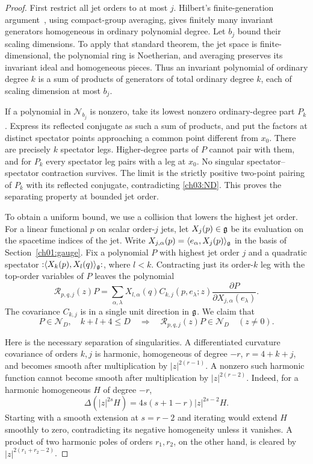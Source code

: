 \begin{proof}
First restrict all jet orders to at most $j$. Hilbert's finite-generation
argument~\cite{Hilbert1890}, using compact-group averaging, gives
finitely many invariant generators homogeneous in ordinary polynomial
degree. Let $b_j$ bound their scaling dimensions. To apply that standard theorem,
the jet space is finite-dimensional, the polynomial ring is Noetherian,
and averaging preserves its invariant ideal and homogeneous pieces.
Thus an invariant polynomial of ordinary degree $k$ is a sum of products
of generators of total ordinary degree $k$, each of scaling dimension at most $b_j$.

If a polynomial in $\mathcal N_{b_j}$ is nonzero, take its lowest
nonzero ordinary-degree part $P_k$. Express its reflected conjugate as
such a sum of products, and put the factors at distinct spectator points
approaching a common point different from $x_0$. There are precisely $k$
spectator legs. Higher-degree parts of $P$ cannot pair with them, and
for $P_k$ every spectator leg pairs with a leg at $x_0$. No singular
spectator--spectator contraction survives. The limit is the strictly
positive two-point pairing of $P_k$ with its reflected conjugate,
contradicting \eqref{ch03:ND}. This proves the separating property at bounded jet order.

To obtain a uniform bound, we use a collision that lowers the highest
jet order. For a linear functional $p$ on scalar order-$j$ jets, let
$X_j(p)\in\mathfrak g$ be its evaluation on the spacetime indices of the jet.
Write $X_{j,\alpha}(p)=\langle e_\alpha,X_j(p)\rangle_{\mathfrak g}$ in
the basis of Section~\ref{ch01:gauge}. Fix a polynomial
$P$ with highest jet order $j$ and a quadratic spectator
${:}\langle X_k(p),X_l(q)\rangle_{\mathfrak g}{:}$, where $l<k$.
Contracting just its order-$k$ leg with the top-order variables of $P$
leaves the polynomial
\begin{equation}\label{ch03:replacement}
 \mathcal R_{p,q,j}(z)P
 =\sum_{\alpha,\lambda}X_{l,\alpha}(q)
 C_{k,j}(p,e_\lambda;z)
           \frac{\partial P}{\partial X_{j,\alpha}(e_\lambda)}.
\end{equation}
The covariance $C_{k,j}$ is in a single unit direction in $\mathfrak g$. We claim that
\begin{equation}\label{ch03:replacement-null}
 P\in\mathcal N_D,\quad k+l+4\le D
 \quad\Longrightarrow\quad
 \mathcal R_{p,q,j}(z)P\in\mathcal N_D\quad(z\ne0).
\end{equation}

Here is the necessary separation of singularities. A differentiated
curvature covariance of orders $k,j$ is harmonic, homogeneous of degree
$-r$, $r=4+k+j$, and becomes smooth after multiplication by
$|z|^{2(r-1)}$. A nonzero such harmonic function cannot become smooth
after multiplication by $|z|^{2(r-2)}$. Indeed, for a harmonic
homogeneous $H$ of degree $-r$,
\[
 \Delta(|z|^{2s}H)=4s(s+1-r)|z|^{2s-2}H.
\]
Starting with a smooth extension at $s=r-2$ and iterating would extend
$H$ smoothly to zero, contradicting its negative homogeneity unless it
vanishes. A product of two harmonic poles of orders $r_1,r_2$,
on the other hand, is cleared by $|z|^{2(r_1+r_2-2)}$.


\end{proof}
